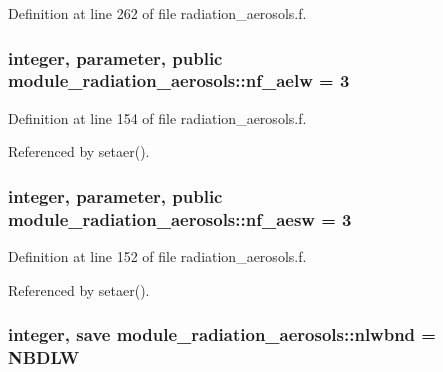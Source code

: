 Definition at line 262 of file radiation\+\_\+aerosols.\+f.

\subsubsection[{\texorpdfstring{nf\+\_\+aelw}{nf_aelw}}]{\setlength{\rightskip}{0pt plus 5cm}integer, parameter, public module\+\_\+radiation\+\_\+aerosols\+::nf\+\_\+aelw = 3}\hypertarget{group__module__radiation__aerosols_gafba0069cd611248a9595a126a13f5203}{}\label{group__module__radiation__aerosols_gafba0069cd611248a9595a126a13f5203}


Definition at line 154 of file radiation\+\_\+aerosols.\+f.



Referenced by setaer().

\subsubsection[{\texorpdfstring{nf\+\_\+aesw}{nf_aesw}}]{\setlength{\rightskip}{0pt plus 5cm}integer, parameter, public module\+\_\+radiation\+\_\+aerosols\+::nf\+\_\+aesw = 3}\hypertarget{group__module__radiation__aerosols_gae0d9615fa694e2a5dfe8fb48e99b7e76}{}\label{group__module__radiation__aerosols_gae0d9615fa694e2a5dfe8fb48e99b7e76}


Definition at line 152 of file radiation\+\_\+aerosols.\+f.



Referenced by setaer().

\subsubsection[{\texorpdfstring{nlwbnd}{nlwbnd}}]{\setlength{\rightskip}{0pt plus 5cm}integer, save module\+\_\+radiation\+\_\+aerosols\+::nlwbnd = N\+B\+D\+LW\hspace{0.3cm}{\ttfamily [private]}}\hypertarget{group__module__radiation__aerosols_gab17b7f75d6d737fd2fc81eae44cba81d}{}\label{group__module__radiation__aerosols_gab17b7f75d6d737fd2fc81eae44cba81d}



